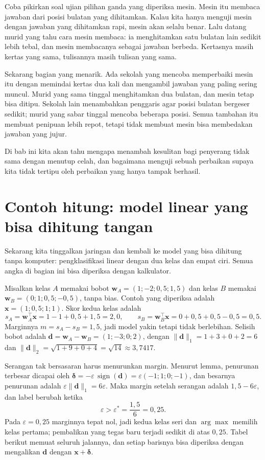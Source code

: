 \begin{untukanak}
Coba pikirkan soal ujian pilihan ganda yang diperiksa mesin. Mesin itu membaca jawaban
dari posisi bulatan yang dihitamkan. Kalau kita hanya menguji mesin dengan jawaban yang
dihitamkan rapi, mesin akan selalu benar. Lalu datang murid yang tahu cara mesin
membaca: ia menghitamkan satu bulatan lain sedikit lebih tebal, dan mesin membacanya
sebagai jawaban berbeda. Kertasnya masih kertas yang sama, tulisannya masih tulisan
yang sama.

Sekarang bagian yang menarik. Ada sekolah yang mencoba memperbaiki mesin itu dengan
memindai kertas dua kali dan mengambil jawaban yang paling sering muncul. Murid yang
sama tinggal menghitamkan dua bulatan, dan mesin tetap bisa ditipu. Sekolah lain
menambahkan penggaris agar posisi bulatan bergeser sedikit; murid yang sabar tinggal
mencoba beberapa posisi. Semua tambahan itu membuat penipuan lebih repot, tetapi tidak
membuat mesin bisa membedakan jawaban yang jujur.

Di bab ini kita akan tahu mengapa menambah kesulitan bagi penyerang tidak sama dengan
menutup celah, dan bagaimana menguji sebuah perbaikan supaya kita tidak tertipu oleh
perbaikan yang hanya tampak berhasil.
\end{untukanak}

\section{Contoh hitung: model linear yang bisa dihitung tangan}

Sekarang kita tinggalkan jaringan dan kembali ke model yang bisa dihitung tanpa
komputer: pengklasifikasi linear dengan dua kelas dan empat ciri. Semua angka di
bagian ini bisa diperiksa dengan kalkulator.

Misalkan kelas $A$ memakai bobot $\mathbf{w}_A=(1;-2;0{,}5;1{,}5)$ dan kelas $B$
memakai $\mathbf{w}_B=(0;1;0{,}5;-0{,}5)$, tanpa bias. Contoh yang diperiksa adalah
$\mathbf{x}=(1;0{,}5;1;1)$. Skor kedua kelas adalah
\[
  s_A=\mathbf{w}_A^{\top}\mathbf{x}=1-1+0{,}5+1{,}5=2{,}0,
  \qquad
  s_B=\mathbf{w}_B^{\top}\mathbf{x}=0+0{,}5+0{,}5-0{,}5=0{,}5 .
\]
Marginnya $m=s_A-s_B=1{,}5$, jadi model yakin tetapi tidak berlebihan. Selisih bobot
adalah $\mathbf{d}=\mathbf{w}_A-\mathbf{w}_B=(1;-3;0;2)$, dengan
$\lVert\mathbf{d}\rVert_1=1+3+0+2=6$ dan
$\lVert\mathbf{d}\rVert_2=\sqrt{1+9+0+4}=\sqrt{14}\approx3{,}7417$.

Serangan tak bersasaran harus menurunkan margin. Menurut lemma, penurunan terbesar
dicapai oleh $\boldsymbol{\delta}=-\varepsilon\,\operatorname{sign}(\mathbf{d})
=\varepsilon(-1;1;0;-1)$, dan besarnya penurunan adalah
$\varepsilon\lVert\mathbf{d}\rVert_1=6\varepsilon$. Maka margin setelah serangan
adalah $1{,}5-6\varepsilon$, dan label berubah ketika
\[
  \varepsilon>\varepsilon^{*}=\frac{1{,}5}{6}=0{,}25 .
\]
Pada $\varepsilon=0{,}25$ marginnya tepat nol, jadi kedua kelas seri dan
$\arg\max$ memilih kelas pertama; pembalikan yang tegas baru terjadi sedikit di atas
$0{,}25$. Tabel berikut memuat seluruh jalannya, dan setiap barisnya bisa diperiksa
dengan mengalikan $\mathbf{d}$ dengan $\mathbf{x}+\boldsymbol{\delta}$.

